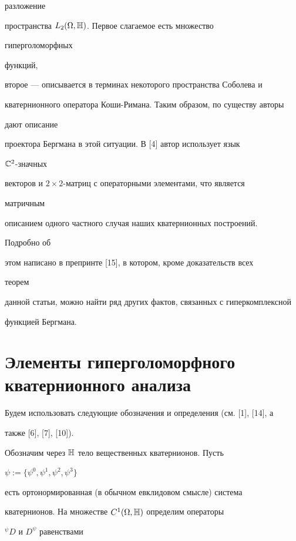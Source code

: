 разложение 


пространства $L_2(\Omega,\Bbb H)$. Первое слагаемое есть множество 


гиперголоморфных 


функций, 


второе --- описывается в терминах некоторого пространства Соболева и 


кватернионного оператора Коши-Римана. Таким образом, по существу авторы 


дают описание 


проектора Бергмана в этой ситуации. В [4] автор использует язык 


$\Bbb C^2$-значных 


векторов и $2\times 2$-матриц с операторными элементами, что является 


матричным 


описанием одного частного случая наших кватернионных построений. 


Подробно об 


этом написано в препринте [15], в котором, кроме доказательств всех 


теорем 


данной статьи, можно найти ряд других фактов, связанных с гиперкомплексной 


функцией Бергмана. 


 


\section{Элементы гиперголоморфного кватернионного анализа} 


 


Будем использовать следующие обозначения и определения (см. [1], [14], а 


также [6], [7], [10]). 


 


Обозначим через $\Bbb H$ тело вещественных кватернионов. Пусть 


$\psi:=\{\psi^0,\psi^1,\psi^2,\psi^3\}$ 


есть ортонормированная (в обычном евклидовом смысле) система 


кватернионов. На множестве $C^1(\Omega,\Bbb H)$ определим операторы 


${}^\psi D$ и $D^\psi$ равенствами 


$$ 



